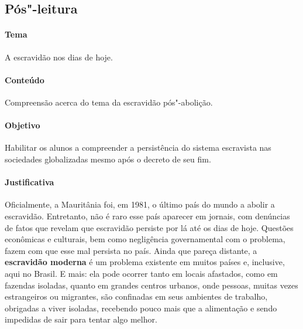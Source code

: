 \documentclass[11pt]{extarticle}
\begin{document}


\subsection{Pós"-leitura}

 \paragraph{Tema} A escravidão nos dias de hoje.

 \paragraph{Conteúdo} Compreensão acerca do tema da escravidão pós"-abolição.

 \paragraph{Objetivo} Habilitar os alunos a compreender a persistência 
 do sistema escravista nas sociedades globalizadas mesmo após o decreto
 de seu fim.

 \paragraph{Justificativa} Oficialmente, a Mauritânia foi, em 1981, o último país do
mundo a abolir a escravidão. Entretanto, não é raro esse país aparecer
em jornais, com denúncias de fatos que revelam que escravidão persiste
por lá até os dias de hoje. Questões econômicas e culturais, bem como
negligência governamental com o problema, fazem com que esse mal
persista no país. Ainda que pareça distante, a \textbf{escravidão
moderna} é um problema existente em muitos países e, inclusive, aqui no
Brasil. E mais: ela pode ocorrer tanto em locais afastados, como em
fazendas isoladas, quanto em grandes centros urbanos, onde pessoas,
muitas vezes estrangeiros ou migrantes, são confinadas em seus ambientes
de trabalho, obrigadas a viver isoladas, recebendo pouco mais que a
alimentação e sendo impedidas de sair para tentar algo melhor.
\end{document}
